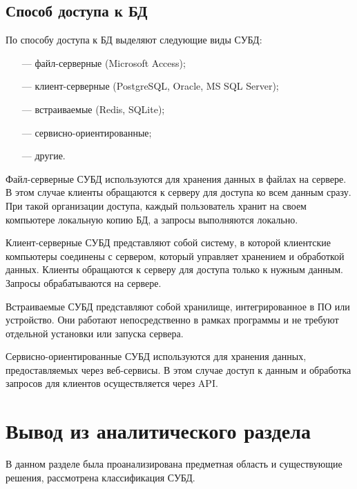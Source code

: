 \subsection{Способ доступа к БД}
По способу доступа к БД выделяют следующие виды СУБД:
\newpage
\begin{itemize}
	\item[---] файл-серверные (Microsoft Access);
	\item[---] клиент-серверные (PostgreSQL, Oracle, MS SQL Server);
	\item[---] встраиваемые (Redis, SQLite);
	\item[---] сервисно-ориентированные;
	\item[---] другие.
\end{itemize}

Файл-серверные СУБД используются для хранения данных в файлах на сервере.
В этом случае клиенты обращаются к серверу для доступа ко всем данным сразу.
При такой организации доступа, каждый пользователь хранит на своем компьютере локальную копию БД, а запросы выполняются локально.

Клиент-серверные СУБД представляют собой систему, в которой клиентские компьютеры соединены с сервером, который управляет хранением и обработкой данных.
Клиенты обращаются к серверу для доступа только к нужным данным.
Запросы обрабатываются на сервере.

Встраиваемые СУБД представляют собой хранилище, интегрированное в ПО или устройство.
Они работают непосредственно в рамках программы и не требуют отдельной установки  или запуска сервера.

Сервисно-ориентированные СУБД используются для хранения данных, предоставляемых через веб-сервисы.
В этом случае доступ к данным и обработка запросов для клиентов осуществляется через API.


\section{Вывод из аналитического раздела}
В данном разделе была проанализирована предметная область и существующие решения, рассмотрена классификация СУБД.